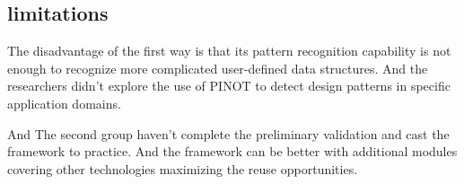 \documentclass{article}
\begin{document}
\subsection{limitations}

The disadvantage of the first way is that its pattern recognition capability is not enough to recognize more complicated user-defined data structures. And the researchers didn’t explore the use of PINOT to detect design patterns in specific application domains.

And The second group haven’t complete the preliminary validation and cast the framework to practice. And the framework can be better with additional modules covering other technologies maximizing the reuse opportunities.
\end{document}
